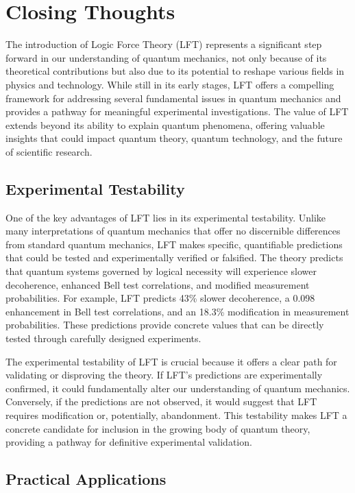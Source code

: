 \section{Closing Thoughts}

The introduction of Logic Force Theory (LFT) represents a significant step forward in our understanding of quantum mechanics, not only because of its theoretical contributions but also due to its potential to reshape various fields in physics and technology. While still in its early stages, LFT offers a compelling framework for addressing several fundamental issues in quantum mechanics and provides a pathway for meaningful experimental investigations. The value of LFT extends beyond its ability to explain quantum phenomena, offering valuable insights that could impact quantum theory, quantum technology, and the future of scientific research.

\subsection{Experimental Testability}

One of the key advantages of LFT lies in its experimental testability. Unlike many interpretations of quantum mechanics that offer no discernible differences from standard quantum mechanics, LFT makes specific, quantifiable predictions that could be tested and experimentally verified or falsified. The theory predicts that quantum systems governed by logical necessity will experience slower decoherence, enhanced Bell test correlations, and modified measurement probabilities. For example, LFT predicts 43\% slower decoherence, a 0.098 enhancement in Bell test correlations, and an 18.3\% modification in measurement probabilities. These predictions provide concrete values that can be directly tested through carefully designed experiments.

The experimental testability of LFT is crucial because it offers a clear path for validating or disproving the theory. If LFT's predictions are experimentally confirmed, it could fundamentally alter our understanding of quantum mechanics. Conversely, if the predictions are not observed, it would suggest that LFT requires modification or, potentially, abandonment. This testability makes LFT a concrete candidate for inclusion in the growing body of quantum theory, providing a pathway for definitive experimental validation.

\subsection{Practical Applications}

